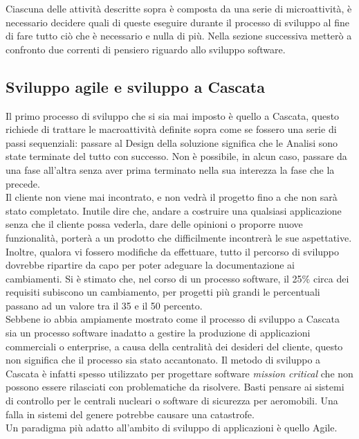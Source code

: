 Ciascuna delle attività descritte sopra è composta da una serie di microattività, è necessario decidere quali di queste eseguire durante il processo di sviluppo al fine di fare tutto ciò che è necessario e nulla di più.
Nella sezione successiva metterò a confronto due correnti di pensiero riguardo allo sviluppo software.

\subsection{Sviluppo agile e sviluppo a Cascata}
Il primo processo di sviluppo che si sia mai imposto è quello a Cascata, questo richiede di trattare le macroattività definite sopra come se fossero una serie di passi sequenziali: passare al Design della soluzione significa che le Analisi sono state terminate del tutto con successo. Non è possibile, in alcun caso, passare da una fase all'altra senza aver prima terminato nella sua interezza la fase che la precede.
\\
Il cliente non viene mai incontrato, e non vedrà il progetto fino a che non sarà stato completato. Inutile dire che, andare a costruire una qualsiasi applicazione senza che il cliente possa vederla, dare delle opinioni o proporre nuove funzionalità, porterà a un prodotto che difficilmente incontrerà le sue aspettative. Inoltre, qualora vi fossero modifiche da effettuare, tutto il percorso di sviluppo dovrebbe ripartire da capo per poter adeguare la documentazione ai cambiamenti. Si è stimato che, nel corso di un processo software, il 25\% circa dei requisiti subiscono un cambiamento, per progetti più grandi le percentuali passano ad un valore tra il 35 e il 50 percento.\cite{Larman2016}
\\
Sebbene io abbia ampiamente mostrato come il processo di sviluppo a Cascata sia un processo software inadatto a gestire la produzione di applicazioni commerciali o enterprise, a causa della centralità dei desideri del cliente, questo non significa che il processo sia stato accantonato. Il metodo di sviluppo a Cascata è infatti spesso utilizzato per progettare software \textit{mission critical} che non possono essere rilasciati con problematiche da risolvere. Basti pensare ai sistemi di controllo per le centrali nucleari o software di sicurezza per aeromobili. Una falla in sistemi del genere potrebbe causare una catastrofe.
\\
Un paradigma più adatto all'ambito di sviluppo di applicazioni è quello Agile.
\\
